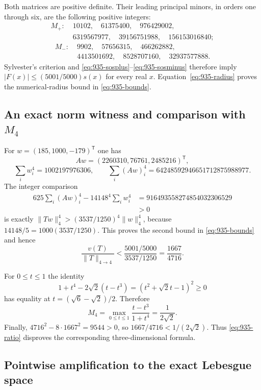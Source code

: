 \documentclass[11pt,a4paper]{article}
\theoremstyle{remark}
\begin{document}
Both matrices are positive definite. Their leading principal minors, in
orders one through six, are the following positive integers:
\[
 \begin{aligned}
 M_+:\;&10102,\quad 61375400,\quad 976429002,\\
       &6319567977,\quad 39156751988,\quad156153016840;
 \end{aligned}
 \tag{935.8}\label{eq:935-minorsplus}
\]
\[
 \begin{aligned}
 M_-:\;&9902,\quad57656315,\quad466262882,\\
       &4413501692,\quad8528707160,\quad32937577888.
 \end{aligned}
 \tag{935.9}\label{eq:935-minorsminus}
\]
Sylvester's criterion and \eqref{eq:935-sosplus}--\eqref{eq:935-sosminus}
therefore imply $|F(x)|\le(5001/5000)s(x)$ for every real $x$.
Equation~\eqref{eq:935-radius} proves the numerical-radius bound in
\eqref{eq:935-bounds}.

\subsection{An exact norm witness and comparison with \texorpdfstring{$M_4$}{M4}}

For $w=(185,1000,-179)^{\mathsf T}$ one has
\[
 Aw=(2260310,76761,2485216)^{\mathsf T},
\]
\[
 \sum_iw_i^4=1002197976306,\qquad
 \sum_i(Aw)_i^4=64248592946651712875988977.
\]
The integer comparison
\[
 \begin{split}
 625\sum_i(Aw)_i^4-14148^4\sum_iw_i^4
 &=916493558274854032306529\\
 &>0
 \end{split}
 \tag{935.10}\label{eq:935-witness}
\]
is exactly
$\|Tw\|_4^4>(3537/1250)^4\|w\|_4^4$, because
$14148/5=1000(3537/1250)$. This proves the second bound in
\eqref{eq:935-bounds} and hence
\[
 \frac{v(T)}{\|T\|_{4\to4}}
 <\frac{5001/5000}{3537/1250}
 =\frac{1667}{4716}.
 \tag{935.11}\label{eq:935-ratio}
\]

For $0\le t\le1$ the identity
\[
 1+t^4-2\sqrt2(t-t^3)=(t^2+\sqrt2t-1)^2\ge0
\]
has equality at $t=(\sqrt6-\sqrt2)/2$. Therefore
\[
 M_4=\max_{0\le t\le1}\frac{t-t^3}{1+t^4}=\frac1{2\sqrt2}.
\]
Finally, $4716^2-8\cdot1667^2=9544>0$, so
$1667/4716<1/(2\sqrt2)$. Thus \eqref{eq:935-ratio} disproves the
corresponding three-dimensional formula.

\subsection{Pointwise amplification to the exact Lebesgue space}
\end{document}
